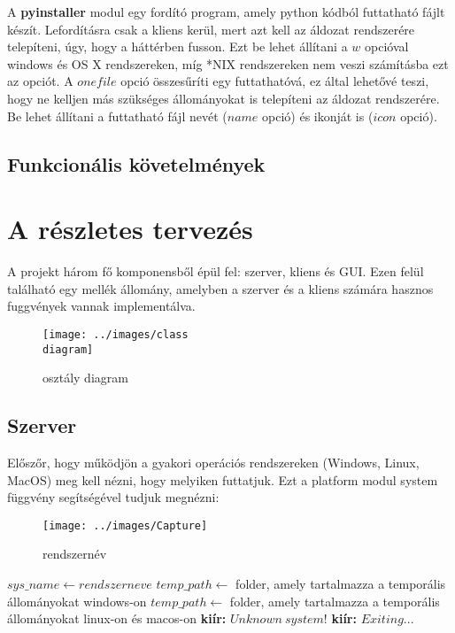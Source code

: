 \documentclass[a4paper, 11pt]{article}
\begin{document}
A \textbf{pyinstaller} modul egy fordító program, amely python kódból futtatható fájlt készít. Lefordításra csak a kliens kerül, mert azt kell az áldozat rendszerére telepíteni, úgy, hogy a háttérben fusson. Ezt be lehet állítani a $w$ opcióval windows és OS X rendszereken, míg *NIX rendszereken nem veszi számításba ezt az opciót. A $onefile$ opció összesűríti egy futtathatóvá, ez által lehetővé teszi, hogy ne kelljen más szükséges állományokat is telepíteni az áldozat rendszerére. Be lehet állítani a futtatható fájl nevét ($name$ opció) és ikonját is ($icon$ opció).



\subsection{Funkcionális követelmények}

\section{A részletes tervezés}\label{sec:plan}
A projekt három fő komponensből épül fel: szerver, kliens és GUI. Ezen felül található egy mellék állomány, amelyben a szerver és a kliens számára hasznos fuggvények vannak implementálva.
\begin{figure}[H]
\centering
\texttt{[image: ../images/class\\ diagram]}
\caption{osztály diagram}
\label{fig:classdia}
\end{figure}
\subsection{Szerver}\label{subsec:server}
Előszőr, hogy működjön a gyakori operációs rendszereken (Windows, Linux, MacOS) meg kell nézni, hogy melyiken futtatjuk. Ezt a platform modul system függvény segítségével tudjuk megnézni:
\begin{figure}[H]
\centering
\texttt{[image: ../images/Capture]}
\caption{rendszernév}
\label{fig:sysname}
\end{figure}

\begin{algorithmic}[H]
\State $sys\_name \gets rendszer neve$
	\State $temp\_path \gets$ folder, amely tartalmazza a temporális állományokat windows-on
	\State $temp\_path \gets$ folder, amely tartalmazza a temporális állományokat linux-on és macos-on
\Else
	\State \textbf{kiír:} $Unknown\ system!$
	\State \textbf{kiír:} $Exiting...$
\EndIf
\end{algorithmic}
\end{document}
